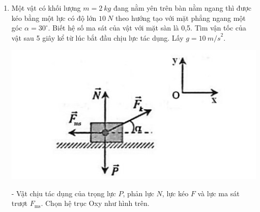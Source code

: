 \begin{enumerate}[label=\bfseries Bài \arabic*:]
	
	\item {}
	
	
	{
		Một vật có khối lượng $m= \SI{2}{kg}$ đang nằm yên trên bàn nằm ngang thì được kéo bằng một lực có độ lớn $\SI{10}{N}$ theo hướng tạo với mặt phẳng ngang một góc $\alpha = 30^\circ$. Biết hệ số ma sát của vật với mặt sàn là 0,5. Tìm vận tốc của vật sau 5 giây kể từ lúc bắt đầu chịu lực tác dụng. Lấy $g = \SI{10}{m/s}^2.$
	}
	
	\hideall
	{
		\begin{center}
			\includegraphics[scale=0.6]{../figs/VN10-2022-PH-TP021-7.jpg}
		\end{center}
		- Vật chịu tác dụng của trọng lực $P$, phản lực $N$, lực kéo $F$ và lực ma sát trượt $F_\text{ms}$. Chọn hệ trục Oxy như hình trên.
		
}
\end{enumerate}
